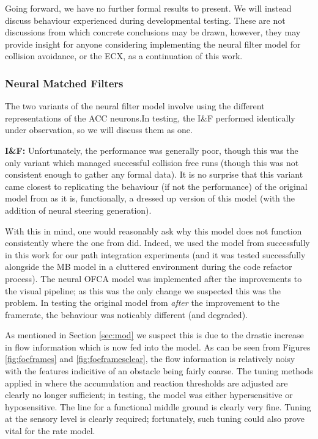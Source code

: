 \documentclass[a4paper,11pt,twoside,openright]{article}
\begin{document}
Going forward, we have no further formal results to present. We will
instead discuss behaviour experienced during developmental
testing. These are not discussions from which concrete conclusions may
be drawn, however, they may provide insight for anyone considering
implementing the neural filter model for collision avoidance, or the
ECX, as a continuation of this work.

\subsubsection{Neural Matched Filters}
The two variants of the neural filter model involve using the
different representations of the ACC neurons.In testing, the I\&F
performed identically under observation, so we will discuss them as
one.\newline\par

\textbf{I\&F:} Unfortunately, the performance was generally poor,
though this was the only variant which managed successful collision
free runs (though this was not consistent enough to gather any formal
data). It is no surprise that this variant came closest to replicating
the behaviour (if not the performance) of the original model from
\cite{Mitchell2018} as it is, functionally, a dressed up version of
this model (with the addition of neural steering generation).
\newline\par

With this in mind, one would reasonably ask why this model does not
function consistently where the one from \cite{Mitchell2018}
did. Indeed, we used the model from \cite{Mitchell2018} successfully
in this work for our path integration experiments (and it was tested
successfully alongside the MB model in a cluttered environment during
the code refactor process). The neural OFCA model was implemented
after the improvements to the visual pipeline; as this was the only
change we suspected this was the problem. In testing the original
model from \cite{Mitchell2018} \textit{after} the improvement to the
framerate, the behaviour was noticably different (and degraded).
\newline\par

As mentioned in Section \ref{sec:mod} we suspect this is due to the
drastic increase in flow information which is now fed into the
model. As can be seen from Figures \ref{fig:foeframes} and
\ref{fig:foeframesclear}, the flow information is relatively noisy
with the features indicitive of an obstacle being fairly coarse. The
tuning methods applied in \cite{Mitchell2018} where the accumulation
and reaction thresholds are adjusted are clearly no longer
sufficient; in testing, the model was either hypersensitive or
hyposensitive. The line for a functional middle ground is clearly very
fine. Tuning at the sensory level is clearly required; fortunately,
such tuning could also prove vital for the rate model.
\newline\par
\end{document}
